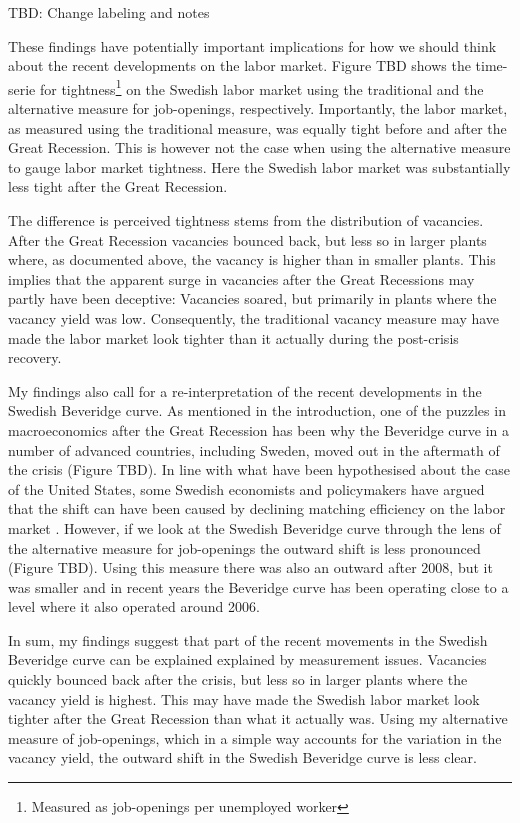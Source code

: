 
TBD: Change labeling and notes

These findings have potentially important implications for how we should think about the recent developments on the labor market. Figure TBD shows the time-serie for tightness\footnote{Measured as job-openings per unemployed worker} on the Swedish labor market using the traditional and the alternative measure for job-openings, respectively. Importantly, the labor market, as measured using the traditional measure, was equally tight before and after the Great Recession. This is however not the case when using the alternative measure to gauge labor market tightness. Here the Swedish labor market was substantially less tight after the Great Recession. 

The difference is perceived tightness stems from the distribution of vacancies. After the Great Recession vacancies bounced back, but less so in larger plants where, as documented above, the vacancy is higher than in smaller plants. This implies that the apparent surge in vacancies after the Great Recessions may partly have been deceptive: Vacancies soared, but primarily in plants where the vacancy yield was low. Consequently, the traditional vacancy measure may have made the labor market look tighter than it actually during the post-crisis recovery. 

My findings also call for a re-interpretation of the recent developments in the Swedish Beveridge curve. As mentioned in the introduction, one of the puzzles in macroeconomics after the Great Recession has been why the Beveridge curve in a number of advanced countries, including Sweden, moved out in the aftermath of the crisis (Figure TBD). In line with what have been hypothesised about the case of the United States, some Swedish economists and policymakers have argued that the shift can have been caused by declining matching efficiency on the labor market \citep{Riksbank2012, Hakanson2014}. However, if we look at the Swedish Beveridge curve through the lens of the alternative measure for job-openings the outward shift is less pronounced (Figure TBD). Using this measure there was also an outward after 2008, but it was smaller and in recent years the Beveridge curve has been operating close to a level where it also operated around 2006. 

In sum, my findings suggest that part of the recent movements in the Swedish Beveridge curve can be explained explained by measurement issues. Vacancies quickly bounced back after the crisis, but less so in larger plants where the vacancy yield is highest. This may have made the Swedish labor market look tighter after the Great Recession than what it actually was. Using my alternative measure of job-openings, which in a simple way accounts for the variation in the vacancy yield, the outward shift in the Swedish Beveridge curve is less clear. 


